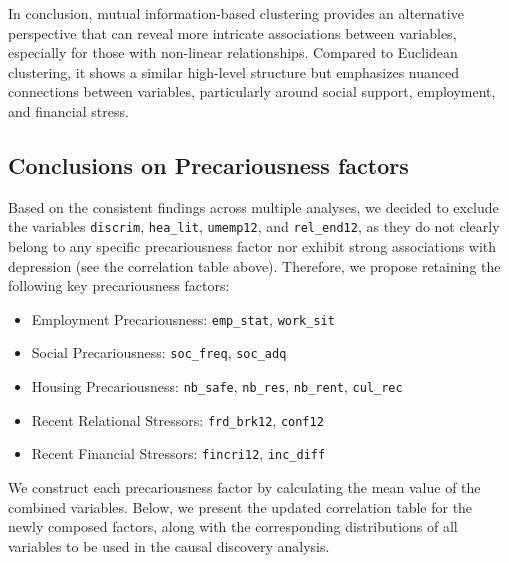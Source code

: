 \documentclass[
]{article}
\providecommand{\tightlist}{%
  \setlength{\itemsep}{0pt}\setlength{\parskip}{0pt}}\usepackage{longtable,booktabs,array}
\begin{document}
In conclusion, mutual information-based clustering provides an
alternative perspective that can reveal more intricate associations
between variables, especially for those with non-linear relationships.
Compared to Euclidean clustering, it shows a similar high-level
structure but emphasizes nuanced connections between variables,
particularly around social support, employment, and financial stress.

\subsection{Conclusions on Precariousness
factors}\label{conclusions-on-precariousness-factors}

Based on the consistent findings across multiple analyses, we decided to
exclude the variables \texttt{discrim}, \texttt{hea\_lit},
\texttt{umemp12}, and \texttt{rel\_end12}, as they do not clearly belong
to any specific precariousness factor nor exhibit strong associations
with depression (see the correlation table above). Therefore, we propose
retaining the following key precariousness factors:

\begin{itemize}
\tightlist
\item
  Employment Precariousness: \texttt{emp\_stat}, \texttt{work\_sit}
\item
  Social Precariousness: \texttt{soc\_freq}, \texttt{soc\_adq}
\item
  Housing Precariousness: \texttt{nb\_safe}, \texttt{nb\_res},
  \texttt{nb\_rent}, \texttt{cul\_rec}
\item
  Recent Relational Stressors: \texttt{frd\_brk12}, \texttt{conf12}
\item
  Recent Financial Stressors: \texttt{fincri12}, \texttt{inc\_diff}
\end{itemize}

We construct each precariousness factor by calculating the mean value of
the combined variables. Below, we present the updated correlation table
for the newly composed factors, along with the corresponding
distributions of all variables to be used in the causal discovery
analysis.
\end{document}
